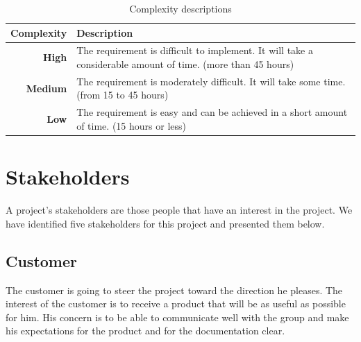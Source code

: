 \begin{table}[h]
\begin{center}
\begin{tabular}{ | r | p{11.5cm} | }
  \hline
  \textbf{Complexity} & \textbf{Description} \\
  \hline\noalign{\smallskip}\noalign{\smallskip}\hline
  \textbf{High} & The requirement is difficult to implement.\newline
  It will take a considerable amount of time. (more than 45 hours) \\
  \textbf{Medium} & The requirement is moderately difficult.\newline
  It will take some time. (from 15 to 45 hours) \\
  \textbf{Low} & The requirement is easy and can be achieved\newline
  in a short amount of time. (15 hours or less) \\
  \hline
\end{tabular}
\end{center}
\caption{Complexity descriptions}
\label{table:complexity}
\end{table}



\section{Stakeholders}
\label{section:stakeholders}
A project's stakeholders are those people that have an interest in the project.
We have identified five stakeholders for this project and presented them below.

\subsection{Customer}
The customer is going to steer the project toward the direction he pleases.
The interest of the customer is to receive a product that will be as useful as possible for him.
His concern is to be able to communicate well with the group and make his expectations for the product
and for the documentation clear.

